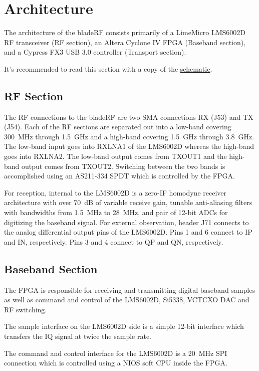 \section{Architecture} \label{sec:arch}

The architecture of the bladeRF consists primarily of a LimeMicro LMS6002D RF
transceiver (RF section), an Altera Cyclone IV FPGA (Baseband section), and a
Cypress FX3 USB 3.0 controller (Transport section).

It's recommended to read this section with a copy of the
\href{https://nuand.com/bladerf.pdf}{schematic}\cite{BLADERF_SCHEMATIC}.

\subsection{RF Section} \label{sec:arch-rf}
The RF connections to the bladeRF are two SMA connections RX (J53) and TX (J54).
Each of the RF sections are separated out into a low-band covering 300~MHz
through 1.5~GHz and a high-band covering 1.5~GHz through 3.8~GHz.  The low-band
input goes into RXLNA1 of the LMS6002D whereas the high-band goes into RXLNA2.
The low-band output comes from TXOUT1 and the high-band output comes from
TXOUT2.  Switching between the two bands is accomplished using an AS211-334
SPDT which is controlled by the FPGA.

For reception, internal to the LMS6002D is a zero-IF homodyne receiver
architecture with over 70~dB of variable receive gain, tunable anti-aliasing
filters with bandwidths from 1.5~MHz to 28~MHz, and pair of 12-bit ADCs for
digitizing the baseband signal.  For external observation, header J71 connects
to the analog differential output pins of the LMS6002D.  Pins 1 and 6 connect
to IP and IN, respectively.  Pins 3 and 4 connect to QP and QN, respectively.

\subsection{Baseband Section} \label{sec:arch-bb}
The FPGA is responsible for receiving and transmitting digital baseband samples
as well as command and control of the LMS6002D, Si5338, VCTCXO DAC and RF
switching.

The sample interface on the LMS6002D side is a simple 12-bit interface which
transfers the IQ signal at twice the sample rate.

The command and control interface for the LMS6002D is a 20~MHz SPI connection
which is controlled using a NIOS soft CPU inside the FPGA.

